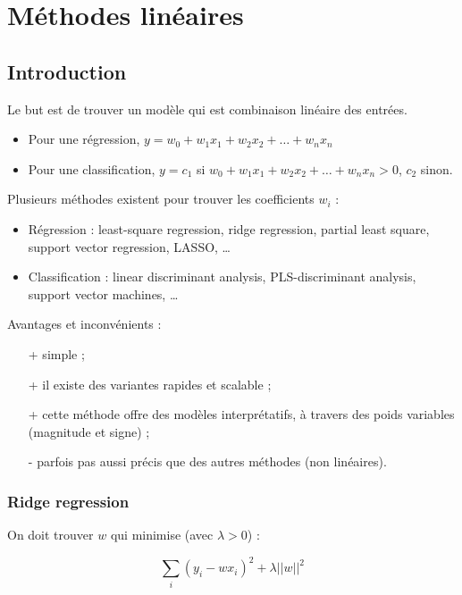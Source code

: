 \chapter{Méthodes linéaires}

	\section{Introduction}
	Le but est de trouver un modèle qui est combinaison linéaire des entrées.

	\begin{itemize}
		\item Pour une régression, $y = w_0 + w_1 x_1 + w_2 x_2 + \dots + w_n x_n$
		\item Pour une classification, $y = c_1$ si $w_0 + w_1 x_1 + w_2 x_2 + \dots + w_n x_n > 0$, $c_2$ sinon.
	\end{itemize}


	Plusieurs méthodes existent pour trouver les coefficients $w_i$ : 

	\begin{itemize}
		\item Régression : least-square regression, ridge regression, partial least square, support vector regression, LASSO, \dots
		\item Classification : linear discriminant analysis, PLS-discriminant analysis, support vector machines, \dots \\
	\end{itemize} 

	Avantages et inconvénients :
	\begin{itemize}
		\item[+] simple ;
		\item[+] il existe des variantes rapides et scalable ;
		\item[+] cette méthode offre des modèles interprétatifs, à travers des poids variables (magnitude et signe) ;
		\item[-] parfois pas aussi précis que des autres méthodes (non linéaires).
	\end{itemize}

		\subsection{Ridge regression}
	
		On doit trouver $w$ qui minimise (avec $\lambda > 0$) :
	
		$$\sum_i (y_i - wx_i)^2 + \lambda \vert \vert w \vert \vert^2$$
	
